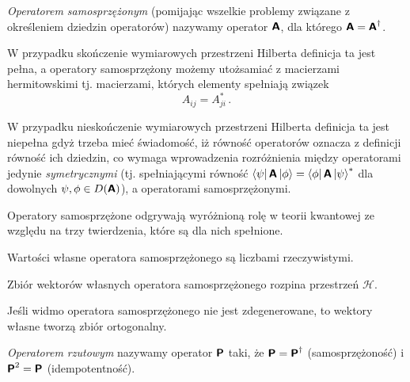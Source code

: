 \documentclass{myclass}
\begin{document}
\linesep

\begin{definition}
    \textit{Operatorem samosprzężonym} (pomijając wszelkie problemy związane z określeniem dziedzin
    operatorów) nazywamy operator \(\boldsymbol{\mathsf{A}}\), dla którego \(\boldsymbol{\mathsf{A}} = \boldsymbol{\mathsf{A}}^\dagger\).
\end{definition}

W przypadku skończenie wymiarowych przestrzeni Hilberta definicja ta jest pełna, a operatory
samosprzężony możemy utożsamiać z macierzami hermitowskimi tj. macierzami, których elementy
spełniają związek
\begin{equation*}
    A_{ij} = A_{ji}^*\,.
\end{equation*}

W przypadku nieskończenie wymiarowych przestrzeni Hilberta definicja ta jest niepełna gdyż trzeba
mieć świadomość, iż równość operatorów oznacza z definicji równość ich dziedzin, co wymaga
wprowadzenia rozróżnienia między operatorami jedynie \textit{symetrycznymi} (tj. spełniającymi
równość \(\bra{\psi}\boldsymbol{\mathsf{A}}\ket{\phi} = \bra{\phi}\boldsymbol{\mathsf{A}}\ket{\psi}^*\) dla dowolnych
\(\psi,\phi\in D(\boldsymbol{\mathsf{A}})\)), a operatorami samosprzężonymi.

Operatory samosprzężone odgrywają wyróżnioną rolę w teorii kwantowej ze względu na trzy twierdzenia,
które są dla nich spełnione.

\begin{theorem}
Wartości własne operatora samosprzężonego są liczbami rzeczywistymi.   
\end{theorem}

\begin{theorem}
Zbiór wektorów własnych operatora samosprzężonego rozpina przestrzeń \(\mathscr{H}\).   
\end{theorem}

\begin{theorem}
Jeśli widmo operatora samosprzężonego nie jest zdegenerowane, to wektory własne tworzą zbiór
ortogonalny.
\end{theorem}

\linesep

\begin{definition}
\textit{Operatorem rzutowym} nazywamy operator \(\boldsymbol{\mathsf{P}}\) taki, że \(\boldsymbol{\mathsf{P}} = \boldsymbol{\mathsf{P}}^\dagger\)
(samosprzężoność) i \(\boldsymbol{\mathsf{P}}^2 = \boldsymbol{\mathsf{P}}\) (idempotentność). 
\end{definition}
\end{document}
